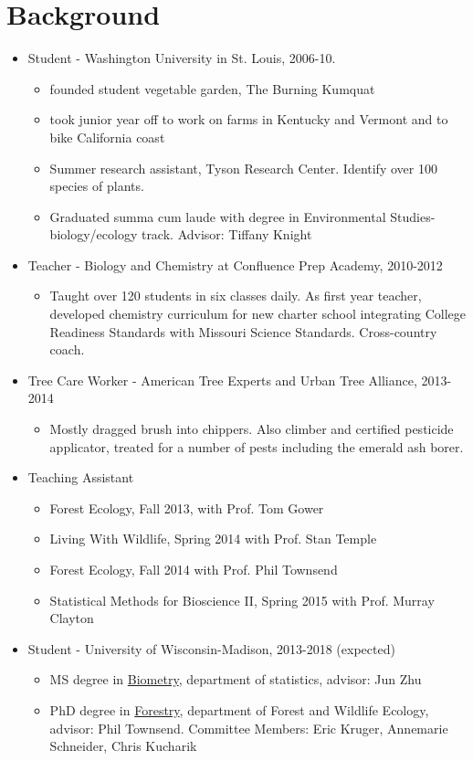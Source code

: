 \documentclass{article}
\begin{document}
\section*{Background}
\label{sec:org0acd7b7}
\begin{itemize}
\item Student - Washington University in St. Louis, 2006-10.
\begin{itemize}
\item founded student vegetable garden, The Burning Kumquat
\item took junior year off to work on farms in Kentucky and Vermont and
to bike California coast
\item Summer research assistant, Tyson Research Center.  Identify over
100 species of plants.
\item Graduated summa cum laude with degree in Environmental Studies-
biology/ecology track.  Advisor: Tiffany Knight
\end{itemize}
\item Teacher - Biology and Chemistry at Confluence Prep Academy, 2010-2012
\begin{itemize}
\item Taught over 120 students in six classes daily.  As first year
teacher, developed chemistry curriculum for new charter school
integrating College Readiness Standards with Missouri Science
Standards.  Cross-country coach.
\end{itemize}
\item Tree Care Worker - American Tree Experts and Urban Tree Alliance, 2013-2014
\begin{itemize}
\item Mostly dragged brush into chippers.  Also climber and certified pesticide
applicator, treated for a number of pests including the emerald
ash borer.
\end{itemize}
\item Teaching Assistant
\begin{itemize}
\item Forest Ecology, Fall 2013, with Prof. Tom Gower
\item Living With Wildlife, Spring 2014 with Prof. Stan Temple
\item Forest Ecology, Fall 2014 with Prof. Phil Townsend
\item Statistical Methods for Bioscience II, Spring 2015 with Prof. Murray Clayton
\end{itemize}
\item Student - University of Wisconsin-Madison, 2013-2018 (expected)
\begin{itemize}
\item MS degree in \href{https://www.stat.wisc.edu/masters-biometry}{Biometry}, department of statistics,
advisor: Jun Zhu
\item PhD degree in \href{http://forestandwildlifeecology.wisc.edu/sites/default/files/ForestryPhDHandbook1162.pdf}{Forestry}, department of Forest and Wildlife Ecology,
advisor: Phil Townsend.  Committee Members: Eric Kruger, Annemarie
Schneider, Chris Kucharik
\end{itemize}
\end{itemize}
\end{document}

